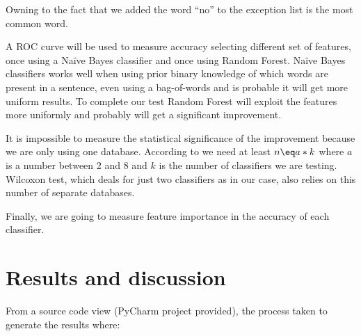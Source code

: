 \documentclass[author-year, review]{elsarticle} %
\let\parencite\cite
\begin{document}
Owning to the fact that we added the word ``no'' to the exception list
is the most common word.

A ROC curve will be used to measure accuracy selecting different set of
features, once using a Naïve Bayes classifier and once using Random
Forest. Naïve Bayes classifiers works well when using prior binary
knowledge of which words are present in a sentence, even using a
bag-of-words and is probable it will get more uniform results. To
complete our test Random Forest will exploit the features more uniformly
and probably will get a significant improvement.

It is impossible to measure the statistical significance of the
improvement because we are only using one database. According to
\parencite{12011}
we need at least $n\eq a*
k$ where
$a$ is a
number between 2 and 8 and
$k$ is
the number of classifiers we are testing. Wilcoxon test, which deals for
just two classifiers as in our case, also relies on this number of
separate databases.

Finally, we are going to measure feature importance in the accuracy of
each classifier.

\section{Results and discussion}\label{results-and-discussion}

From a source code view (PyCharm project provided), the process taken to
generate the results where:
\end{document}
